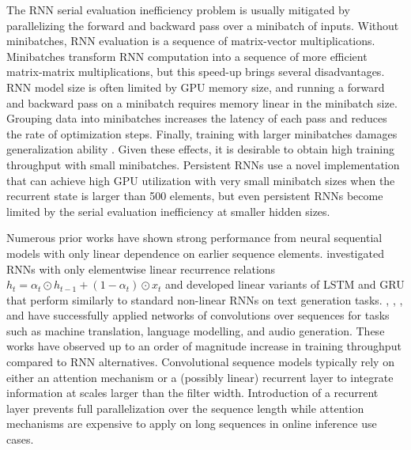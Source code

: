 \documentclass{article}
\begin{document}
The RNN serial evaluation inefficiency problem is usually mitigated by
parallelizing the forward and backward pass over a minibatch of inputs. Without
minibatches, RNN evaluation is a sequence of matrix-vector
multiplications. Minibatches transform RNN computation into a sequence of more
efficient matrix-matrix multiplications, but this speed-up brings several
disadvantages.  RNN model size is often limited by GPU memory size, and running
a forward and backward pass on a minibatch requires memory linear in the
minibatch size.  Grouping data into minibatches increases the latency of each
pass and reduces the rate of optimization steps. Finally, training with larger
minibatches damages generalization ability \citep{keskar2017large}. Given these
effects, it is desirable to obtain high training throughput with small minibatches.
Persistent RNNs \citep{diamos2016persistent} use a novel
implementation that can achieve high GPU utilization with very small minibatch
sizes when the recurrent state is larger than 500 elements, but even persistent
RNNs become limited by the serial evaluation inefficiency at smaller hidden
sizes.

Numerous prior works have shown strong performance from neural sequential models
with only linear dependence on earlier sequence
elements. \citet{balduzzi2016strongly} investigated RNNs with only elementwise
linear recurrence relations $h_t = \alpha_t \odot h_{t-1} + (1-\alpha_t) \odot
x_t$ and developed linear variants of LSTM and GRU that perform similarly to
standard non-linear RNNs on text generation tasks. \citet{bradbury2017quasi},
\citet{kalchbrenner2016neural}, \citet{gehring2017convolutional}, and
\citet{van2016wavenet} have successfully applied networks of convolutions over
sequences for tasks such as machine translation, language modelling, and audio
generation.  These works have observed up to an order of magnitude increase in
training throughput compared to RNN alternatives. Convolutional sequence models
typically rely on either an attention mechanism or a (possibly linear) recurrent
layer to integrate information at scales larger than the filter
width. Introduction of a recurrent layer prevents full parallelization over the
sequence length while attention mechanisms are expensive to apply on long
sequences in online inference use cases.
\end{document}
